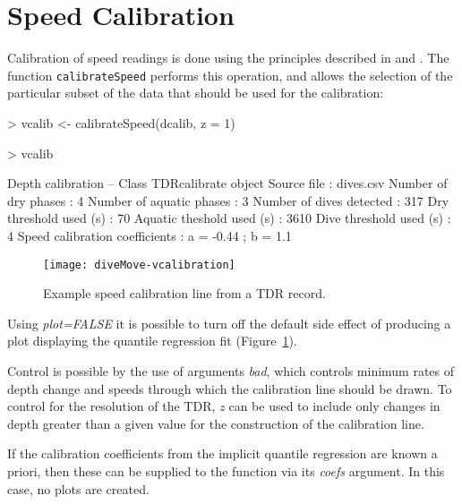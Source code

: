 \documentclass[12pt, letterpaper]{scrartcl}
\newcommand{\Rfunction}[1]{{\texttt{#1}}}
\newcommand{\Rfunarg}[1]{{\textit{#1}}}
\begin{document}
\section{Speed Calibration}
\label{sec:speed}

Calibration of speed readings is done using the principles described in
\citet{1929} and \citet{1291}.  The function \Rfunction{calibrateSpeed}
performs this operation, and allows the selection of the particular subset
of the data that should be used for the calibration:

\begin{Schunk}
\begin{Sinput}
> vcalib <- calibrateSpeed(dcalib, z = 1)
\end{Sinput}
\end{Schunk}
\begin{Schunk}
\begin{Sinput}
> vcalib
\end{Sinput}
\begin{Soutput}
Depth calibration -- Class TDRcalibrate object
  Source file                       : dives.csv 
  Number of dry phases              : 4 
  Number of aquatic phases          : 3 
  Number of dives detected          : 317 
  Dry threshold used (s)            : 70 
  Aquatic theshold used (s)         : 3610 
  Dive threshold used (s)           : 4 
  Speed calibration coefficients    : a = -0.44 ; b = 1.1 
\end{Soutput}
\end{Schunk}
\begin{figure}[hbtp]
  \centering
  \texttt{[image: diveMove-vcalibration]}
  \caption{Example speed calibration line from a TDR record.}
  \label{fig:rqplots}
\end{figure}

Using \Rfunarg{plot=FALSE} it is possible to turn off the default side
effect of producing a plot displaying the quantile regression fit
(Figure~\ref{fig:rqplots}).

Control is possible by the use of arguments \Rfunarg{bad}, which controls
minimum rates of depth change and speeds through which the calibration
line should be drawn.  To control for the resolution of the TDR,
\Rfunarg{z} can be used to include only changes in depth greater than a
given value for the construction of the calibration line.

If the calibration coefficients from the implicit quantile regression are
known a priori, then these can be supplied to the function via its
\Rfunarg{coefs} argument.  In this case, no plots are created.
\end{document}
